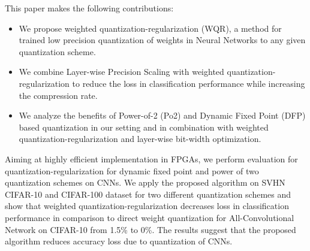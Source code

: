 
\vspace{2ex}
This paper makes the following contributions:
\begin{itemize}
\item We propose weighted quantization-regularization (WQR), a method for trained low precision quantization of weights in Neural Networks to any given quantization scheme.

\item We combine Layer-wise Precision Scaling \cite{Zhou2017} with weighted quantization-regularization to reduce the loss in classification performance while increasing the compression rate.

\item We analyze the benefits of Power-of-2 (Po2) and Dynamic Fixed Point (DFP) based quantization in our setting and in combination with weighted quantization-regularization and layer-wise bit-width optimization.
\end{itemize}

Aiming at highly efficient implementation in FPGAs, we perform evaluation 
for quantization-regularization for dynamic fixed point \cite{Hubara2016} and 
power of two quantization \cite{Zhou2017a} schemes on CNNs. We apply the proposed 
algorithm on SVHN CIFAR-10 and CIFAR-100 dataset for two different quantization schemes and show that weighted quantization-regularization decreases loss in classification performance in comparison to direct weight quantization for All-Convolutional Network on CIFAR-10 from 1.5\% to 0\%. The results suggest that the proposed algorithm reduces accuracy loss due to quantization of CNNs.








